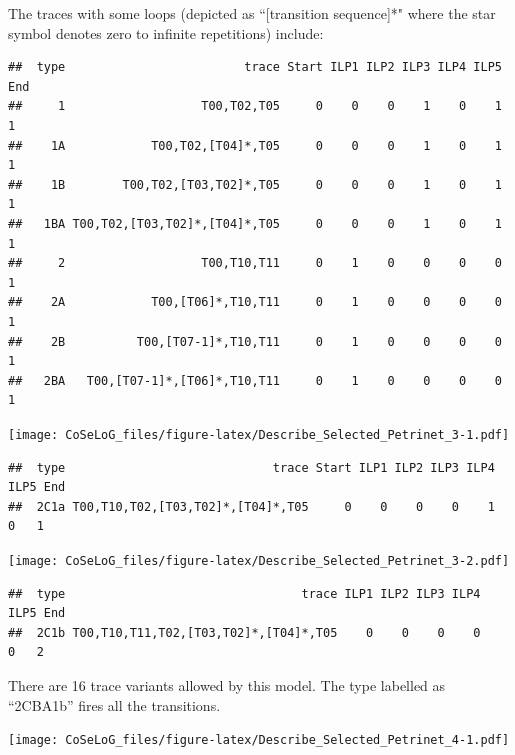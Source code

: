 \documentclass[]{article}
\begin{document}
The traces with some loops (depicted as ``{[}transition sequence{]}*"
where the star symbol denotes zero to infinite repetitions) include:

\begin{verbatim}
##  type                         trace Start ILP1 ILP2 ILP3 ILP4 ILP5 End
##     1                   T00,T02,T05     0    0    0    1    0    1   1
##    1A            T00,T02,[T04]*,T05     0    0    0    1    0    1   1
##    1B        T00,T02,[T03,T02]*,T05     0    0    0    1    0    1   1
##   1BA T00,T02,[T03,T02]*,[T04]*,T05     0    0    0    1    0    1   1
##     2                   T00,T10,T11     0    1    0    0    0    0   1
##    2A            T00,[T06]*,T10,T11     0    1    0    0    0    0   1
##    2B          T00,[T07-1]*,T10,T11     0    1    0    0    0    0   1
##   2BA   T00,[T07-1]*,[T06]*,T10,T11     0    1    0    0    0    0   1
\end{verbatim}

\texttt{[image: CoSeLoG\_files/figure-latex/Describe\_Selected\_Petrinet\_3-1.pdf]}

\begin{verbatim}
##  type                             trace Start ILP1 ILP2 ILP3 ILP4 ILP5 End
##  2C1a T00,T10,T02,[T03,T02]*,[T04]*,T05     0    0    0    0    1    0   1
\end{verbatim}

\texttt{[image: CoSeLoG\_files/figure-latex/Describe\_Selected\_Petrinet\_3-2.pdf]}

\begin{verbatim}
##  type                                 trace ILP1 ILP2 ILP3 ILP4 ILP5 End
##  2C1b T00,T10,T11,T02,[T03,T02]*,[T04]*,T05    0    0    0    0    0   2
\end{verbatim}

There are 16 trace variants allowed by this model. The type labelled as
``2CBA1b'' fires all the transitions.

\texttt{[image: CoSeLoG\_files/figure-latex/Describe\_Selected\_Petrinet\_4-1.pdf]}
\end{document}
